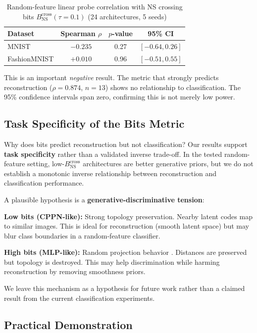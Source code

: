 \documentclass{article}
\begin{document}
\begin{table}[H]
\centering
\caption{Random-feature linear probe correlation with NS crossing bits $B_{\text{NS}}^{\text{cross}}(\tau{=}0.1)$ (24 architectures, 5 seeds)}
\label{tab:classification}
\begin{tabular}{lccc}
\toprule
Dataset & Spearman $\rho$ & $p$-value & 95\% CI \\
\midrule
MNIST & $-0.235$ & 0.27 & $[-0.64, 0.26]$ \\
FashionMNIST & $+0.010$ & 0.96 & $[-0.51, 0.55]$ \\
\bottomrule
\end{tabular}
\end{table}

This is an important \emph{negative} result. The metric that strongly predicts reconstruction ($\rho = 0.874$, $n=13$) shows no relationship to classification. The 95\% confidence intervals span zero, confirming this is not merely low power.

\subsection{Task Specificity of the Bits Metric}

Why does bits predict reconstruction but not classification? Our results support \textbf{task specificity} rather than a validated inverse trade-off. In the tested random-feature setting, low-$B_{\text{NS}}^{\text{cross}}$ architectures are better generative priors, but we do not establish a monotonic inverse relationship between reconstruction and classification performance.

A plausible hypothesis is a \textbf{generative-discriminative tension}:

\textbf{Low bits (CPPN-like):} Strong topology preservation. Nearby latent codes map to similar images. This is ideal for reconstruction (smooth latent space) but may blur class boundaries in a random-feature classifier.

\textbf{High bits (MLP-like):} Random projection behavior \cite{johnson1984extensions}. Distances are preserved but topology is destroyed. This may help discrimination while harming reconstruction by removing smoothness priors.

We leave this mechanism as a hypothesis for future work rather than a claimed result from the current classification experiments.

\subsection{Practical Demonstration}
\label{sec:practical}
\end{document}
